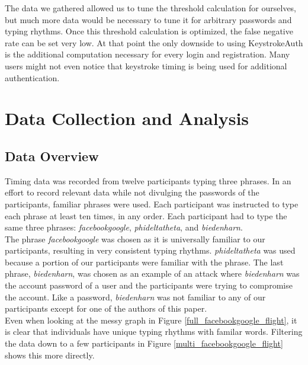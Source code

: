 \documentclass{article}
\begin{document}
The data we gathered allowed us to tune the threshold calculation for ourselves, but much more data would be necessary to tune it for arbitrary passwords and typing rhythms. Once this threshold calculation is optimized, the false negative rate can be set very low. 
At that point the only downside to using KeystrokeAuth is the additional computation necessary for every login and registration.
Many users might not even notice that keystroke timing is being used for additional authentication.

\section{Data Collection and Analysis}

\subsection{Data Overview}
Timing data was recorded from twelve participants typing three phrases. In an effort to record relevant data while not divulging the passwords of the participants, familiar phrases were used. Each participant was instructed to type each phrase at least ten times, in any order. Each participant had to type the same three phrases: \textit{facebookgoogle}, \textit{phideltatheta}, and \textit{biedenharn}.\\

The phrase \textit{facebookgoogle} was chosen as it is universally familiar to our participants, resulting in very consistent typing rhythms. \textit{phideltatheta} was used because a portion of our participants were familiar with the phrase. The last phrase, \textit{biedenharn}, was chosen as an example of an attack where \textit{biedenharn} was the account password of a user and the participants were trying to compromise the account. Like a password, \textit{biedenharn} was not familiar to any of our participants except for one of the authors of this paper.\\

Even when looking at the messy graph in Figure \ref{full_facebookgoogle_flight}, it is clear that individuals have unique typing rhythms with familar words. Filtering the data down to a few participants in Figure \ref{multi_facebookgoogle_flight} shows this more directly.
\end{document}
